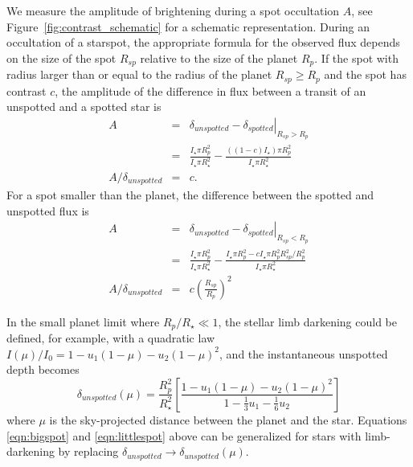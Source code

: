 \begin{subappendices}
We measure the amplitude of brightening during a spot occultation $A$, see Figure~\ref{fig:contrast_schematic} for a schematic representation. During an occultation of a starspot, the appropriate formula for the observed flux depends on the size of the spot $R_{sp}$ relative to the size of the planet $R_{p}$. If the spot with radius larger than or equal to the radius of the planet $R_{sp} \ge R_p$ and the spot has contrast $c$, the amplitude of the difference in flux between a transit of an unspotted and a spotted star is
\begin{eqnarray}
 A &=& \left. \delta_{unspotted} - \delta_{spotted} \right|_{R_{sp} > R_p} \\
 &=& \frac{I_\star \pi R_p^2}{I_\star \pi R_\star^2} - \frac{((1 - c)I_\star) \pi R_p^2}{ I_\star \pi R_\star^2}\\
A/\delta_{unspotted} &=&  c. \label{eqn:bigspot}
\end{eqnarray}
For a spot smaller than the planet, the difference between the spotted and unspotted flux is
\begin{eqnarray}
 A &=& \left. \delta_{unspotted} - \delta_{spotted} \right|_{R_{sp} < R_p} \\
 &=& \frac{I_\star \pi R_p^2}{I_\star \pi R_\star^2} - \frac{I_\star \pi R_p^2 - c I_\star \pi R_p^2 R_{sp}^2/R_p^2}{ I_\star \pi R_\star^2}\\
 A/\delta_{unspotted} &=&  c \left(\frac{R_{sp}}{R_p}\right)^2
 \label{eqn:littlespot}
\end{eqnarray}

In the small planet limit where $R_p/R_\star \ll 1$, the stellar limb darkening could be defined, for example, with a quadratic law $I(\mu)/I_0 = 1 - u_1(1-\mu) - u_2(1-\mu)^2$, and the instantaneous unspotted depth becomes 
\begin{equation}
\delta_{unspotted}(\mu) =  \frac{R_p^2}{R_\star^2} \left[ \frac{1 - u_1(1-\mu) - u_2(1-\mu)^2}{1 - \frac{1}{3}u_1 - \frac{1}{6}u_2} \right]
\end{equation}
where $\mu$ is the sky-projected distance between the planet and the star. Equations \ref{eqn:bigspot} and \ref{eqn:littlespot} above can be generalized for stars with limb-darkening by replacing $\delta_{unspotted} \rightarrow \delta_{unspotted}(\mu)$.

\end{subappendices}




% 

